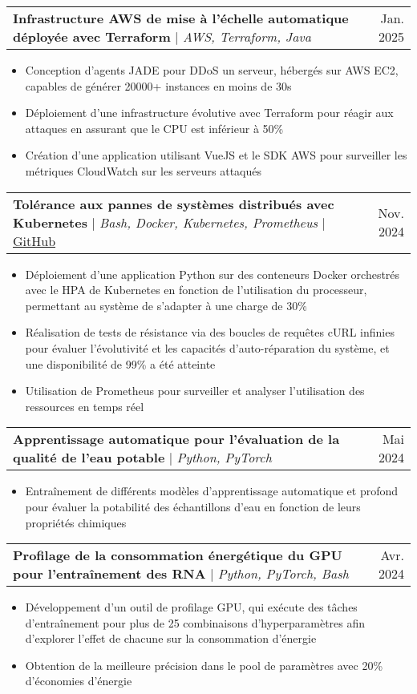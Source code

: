 \documentclass[letterpaper,10.5t]{article}
\makeatletter
\newcommand{\resumeItem}[1]{
  \item\small{
    {#1 \vspace{-2pt}}
  }
}
\newcommand{\resumeProjectHeading}[2]{
    \item
    \begin{tabular*}{0.97\textwidth}{l@{\extracolsep{\fill}}r}
      \small#1 & #2 \\
    \end{tabular*}\vspace{-7pt}
}
\newcommand{\resumeItemListStart}{\begin{itemize}}
\newcommand{\resumeItemListEnd}{\end{itemize}\vspace{-5pt}}
\makeatother
\begin{document}
        \resumeProjectHeading
        {\textbf{Infrastructure AWS de mise à l'échelle automatique déployée avec Terraform} $|$ \emph{AWS, Terraform, Java}}{Jan. 2025}
            \resumeItemListStart
                \resumeItem{Conception d'agents JADE pour DDoS un serveur, hébergés sur AWS EC2, capables de générer 20000+ instances en moins de 30s}
                \resumeItem{Déploiement d'une infrastructure évolutive avec Terraform pour réagir aux attaques en assurant que le CPU est inférieur à 50\%}
                \resumeItem{Création d'une application utilisant VueJS et le SDK AWS pour surveiller les métriques CloudWatch sur les serveurs attaqués}
            \resumeItemListEnd

        \resumeProjectHeading
        {\textbf{Tolérance aux pannes de systèmes distribués avec Kubernetes} $|$ \emph{Bash, Docker, Kubernetes, Prometheus} $|$ \href{https://github.com/Somnef/kubernetes-fault-tolerance}{\underline{GitHub}}}{Nov. 2024}
            \resumeItemListStart
                \resumeItem{Déploiement d'une application Python sur des conteneurs Docker orchestrés avec le HPA de Kubernetes en fonction de l'utilisation du processeur, permettant au système de s'adapter à une charge de 30\%}
                \resumeItem{Réalisation de tests de résistance via des boucles de requêtes cURL infinies pour évaluer l'évolutivité et les capacités d'auto-réparation du système, et une disponibilité de 99\% a été atteinte}
                \resumeItem{Utilisation de Prometheus pour surveiller et analyser l'utilisation des ressources en temps réel}
            \resumeItemListEnd

        \resumeProjectHeading
        {\textbf{Apprentissage automatique pour l'évaluation de la qualité de l'eau potable} $|$ \emph{Python, PyTorch}}{Mai 2024}
            \resumeItemListStart
                \resumeItem{Entraînement de différents modèles d'apprentissage automatique et profond pour évaluer la potabilité des échantillons d'eau en fonction de leurs propriétés chimiques}
            \resumeItemListEnd

        \resumeProjectHeading
        {\textbf{Profilage de la consommation énergétique du GPU pour l'entraînement des RNA} $|$ \emph{Python, PyTorch, Bash}}{Avr. 2024}
            \resumeItemListStart
                \resumeItem{Développement d'un outil de profilage GPU, qui exécute des tâches d'entraînement pour plus de 25 combinaisons d'hyperparamètres afin d'explorer l'effet de chacune sur la consommation d'énergie}
                \resumeItem{Obtention de la meilleure précision dans le pool de paramètres avec 20\% d'économies d'énergie}
            \resumeItemListEnd
\end{document}
